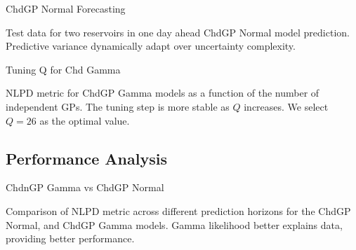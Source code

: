 \begin{frame}{ChdGP Normal Forecasting}
	\centering
	\begin{figure}[htbp]
		\setlength{} 
		\setlength{}
		
		\subfloat[$I.$]{}
		\subfloat[$O.$]{}
	\end{figure}
	\vspace{-1.5em}
	\begin{block}{}
		Test data for two reservoirs in one day ahead ChdGP Normal model prediction. Predictive variance dynamically adapt over uncertainty complexity.
	\end{block}
\end{frame}

\begin{frame}{Tuning Q for Chd Gamma}
	\begin{figure}[htbp]
		\tiny
		\centering
		\setlength\figurewidth{\columnwidth} 
		\setlength{}
		
	\end{figure}
	\vspace{-1.0em}
	\begin{block}{}
		NLPD metric for ChdGP Gamma models as a function of the number of independent GPs. The tuning step is more stable as $Q$ increases. We select $Q = 26$ as the optimal value.
	\end{block}
\end{frame}

\subsection{Performance Analysis}

\begin{frame}{ChdnGP Gamma vs ChdGP Normal}
	\begin{figure}[htbp]
		\tiny
		\centering
		\setlength\figurewidth{\columnwidth} 
		\setlength{}
		
	\end{figure}
	\vspace{-1.0em}
	\begin{block}{}
		Comparison of NLPD metric across different prediction horizons for the ChdGP Normal, and ChdGP Gamma models. Gamma likelihood better explains data, providing better performance.
	\end{block}
\end{frame}

